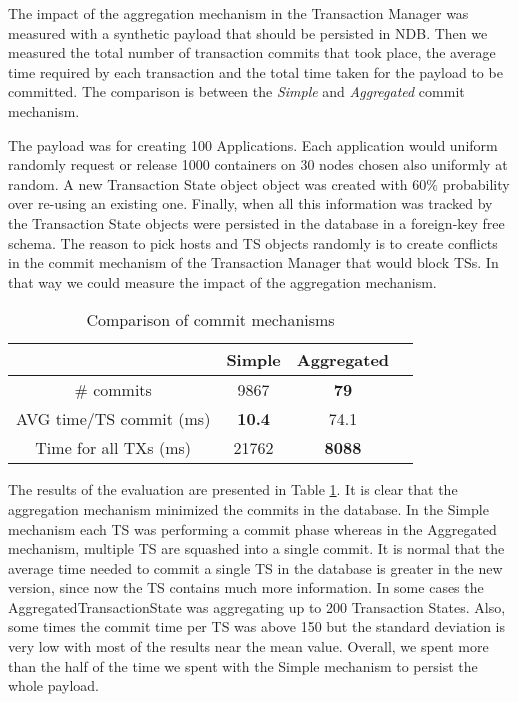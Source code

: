 The impact of the aggregation mechanism in the Transaction Manager was
measured with a synthetic payload that should be persisted in
NDB. Then we measured the total number of transaction commits that
took place, the average time required by each transaction and the
total time taken for the payload to be committed. The comparison is
between the \emph{Simple} and \emph{Aggregated} commit mechanism.

The payload was for creating 100 Applications. Each application would
uniform randomly request or release 1000 containers on 30 nodes
chosen also uniformly at random. A new Transaction State object object
was created with 60$\%$ probability over re-using an existing
one. Finally, when all this information was tracked by the Transaction
State objects were persisted in the database in a foreign-key free
schema. The reason to pick hosts
and TS objects randomly is to create conflicts in the commit mechanism
of the Transaction Manager that would block TSs. In that way we could
measure the impact of the aggregation mechanism.

\begin{table}
\centering
\begin{tabular}{| c | c | c | c |}
\hline
  & Simple & Aggregated \\
\hline
\# commits & 9867 & \textbf{79} \\
\hline
AVG time/TS commit (ms) & \textbf{10.4} & 74.1 \\
\hline
Time for all TXs (ms) & 21762 & \textbf{8088} \\
\hline
\end{tabular}
\caption{Comparison of commit mechanisms}
\label{tab:ev_commit_mechanism}
\end{table}

The results of the evaluation are presented in Table
\ref{tab:ev_commit_mechanism}. It is clear that the aggregation
mechanism minimized the commits in the database. In the Simple mechanism
each TS was performing a commit phase whereas in the Aggregated mechanism,
multiple TS are squashed into a single commit. It is normal that the
average time needed to commit a single TS in the database is greater
in the new version, since now the TS contains much more
information. In some cases the AggregatedTransactionState was
aggregating up to 200 Transaction States. Also, some times the commit
time per TS was above 150 but the standard deviation is very low with
most of the results near the mean value. Overall, we spent more
than the half of the time we spent with the Simple mechanism to persist
the whole payload.